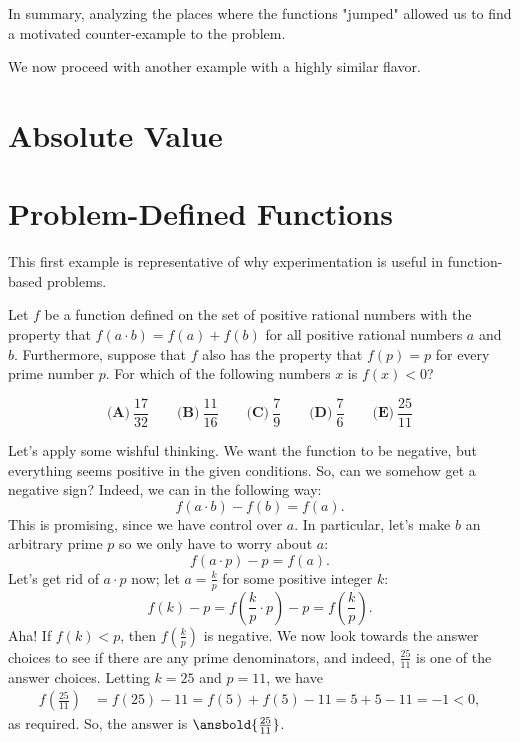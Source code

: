 \documentclass{article}
\begin{document}
\bigskip

In summary, analyzing the places where the functions "jumped" allowed us to find a motivated counter-example to the problem.  

We now proceed with another example with a highly similar flavor.

\section{Absolute Value}

\section{Problem-Defined Functions}

This first example is representative of why experimentation is useful in function-based problems. 

\begin{exam}[2021 AMC 10A/18]
Let $f$ be a function defined on the set of positive rational numbers with the property that $f(a\cdot b)=f(a)+f(b)$ for all positive rational numbers $a$ and $b$. Furthermore, suppose that $f$ also has the property that $f(p)=p$ for every prime number $p$. For which of the following numbers $x$ is $f(x)<0$?

$$\textbf{(A)} ~\frac{17}{32}\qquad\textbf{(B)} ~\frac{11}{16}\qquad\textbf{(C)} ~\frac{7}{9}\qquad\textbf{(D)} ~\frac{7}{6} \qquad\textbf{(E)} ~\frac{25}{11}$$
\end{exam}

\begin{sol}
Let's apply some wishful thinking. We want the function to be negative, but everything seems positive in the given conditions. So, can we somehow get a negative sign? Indeed, we can in the following way:
 \[ f(a \cdot b) - f(b) = f(a). \]
This is promising, since we have control over $a$. In particular, let's make $b$ an arbitrary prime $p$ so we only have to worry about $a$:
 \[ f(a \cdot p) - p = f(a). \]
Let's get rid of $a \cdot p$ now; let $a = \frac{k}{p}$ for some positive integer $k$:
 \[ f(k) - p = f\left( \frac{k}{p}\cdot p\right) - p = f\left(\frac{k}{p}\right). \]
Aha! If $f(k) < p$, then $f\left(\frac{k}{p}\right)$ is negative. We now look towards the answer choices to see if there are any prime denominators, and indeed, $\frac{25}{11}$ is one of the answer choices. Letting $k = 25$ and $p = 11$, we have
\begin{align*}
f\left(\frac{25}{11}\right) &= f(25) - 11 = f(5) + f(5) - 11 = 5 + 5 - 11 = -1 < 0,
\end{align*}
as required. So, the answer is $\ansbold{\frac{25}{11}}$.
\end{sol}
\end{document}
